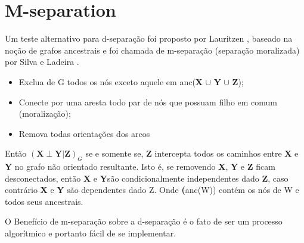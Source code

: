 \section{M-separation}
Um teste alternativo para d-separação foi proposto por Lauritzen \cite{lauritzen90}, baseado na noção de grafos ancestrais e foi chamada de m-separação (separação moralizada) por Silva e Ladeira \cite{daSL02}.
\begin{itemize}
	\item Exclua de G todos os nós exceto aquele em anc(\textbf{X} $\cup$ \textbf{Y} $\cup$ \textbf{Z});
	\item Conecte por uma aresta todo par de nós que possuam filho em comum (moralização);
	\item Remova todas orientações dos arcos
\end{itemize}
Então $(\textbf{X} \perp \textbf{Y}|\textbf{Z})_G$ se e somente se, \textbf{Z} intercepta todos os caminhos entre \textbf{X} e \textbf{Y} no grafo não orientado resultante. Isto é, se removendo \textbf{X}, \textbf{Y} e \textbf{Z} ficam desconectados, então \textbf{X} e \textbf{Y}são condicionalmente independentes dado \textbf{Z}, caso contrário \textbf{X} e \textbf{Y} são dependentes dado Z. Onde \textbf(anc(W)) contém os nós de W e todos seus ancestrais.

O Benefício de m-separação sobre a d-separação é o fato de ser um processo algorítmico e portanto fácil de se implementar.
